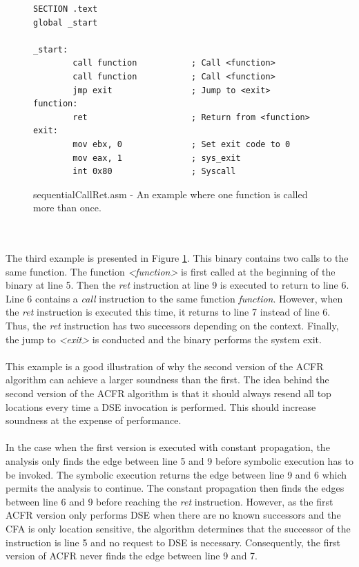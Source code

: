 \documentclass{kththesis}
\renewcommand{\it}[1]{\textit{#1}}
\begin{document}
\begin{figure}[!t]
    \centering
\begin{tcolorbox}
\begin{verbatim}
SECTION .text
global _start

_start:
        call function           ; Call <function>
        call function           ; Call <function>
        jmp exit                ; Jump to <exit>
function:
        ret                     ; Return from <function>
exit:
        mov ebx, 0              ; Set exit code to 0
        mov eax, 1              ; sys_exit
        int 0x80                ; Syscall
\end{verbatim}
\end{tcolorbox}
\caption{sequentialCallRet.asm - An example where one function is called more than once.}
    \label{fig:sequentialCallRet}
\end{figure}
\\ \\
The third example is presented in Figure \ref{fig:sequentialCallRet}. This binary contains two calls to the same function. The function \it{<function>} is first called at the beginning of the binary at line 5. Then the \it{ret} instruction at line 9 is executed to return to line 6. Line 6 contains a \it{call} instruction to the same function \it{function}. However, when the \it{ret} instruction is executed this time, it returns to line 7 instead of line 6. Thus, the \it{ret} instruction has two successors depending on the context. Finally, the jump to \it{<exit>} is conducted and the binary performs the system exit.
\\ \\
This example is a good illustration of why the second version of the ACFR algorithm can achieve a larger soundness than the first. The idea behind the second version of the ACFR algorithm is that it should always resend all top locations every time a DSE invocation is performed. This should increase soundness at the expense of performance.
\\ \\
In the case when the first version is executed with constant propagation, the analysis only finds the edge between line 5 and 9 before symbolic execution has to be invoked. The symbolic execution returns the edge between line 9 and 6 which permits the analysis to continue. The constant propagation then finds the edges between line 6 and 9 before reaching the \it{ret} instruction. However, as the first ACFR version only performs DSE when there are no known successors and the CFA is only location sensitive, the algorithm determines that the successor of the instruction is line 5 and no request to DSE is necessary. Consequently, the first version of ACFR never finds the edge between line 9 and 7.
\end{document}
